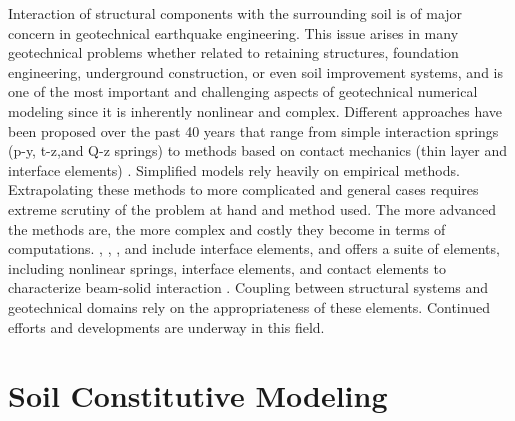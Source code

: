 Interaction of structural components with the surrounding soil is of major concern in geotechnical earthquake engineering. This issue arises in many geotechnical problems whether related to retaining structures, foundation engineering, underground construction, or even soil improvement systems, and is one of the most important and challenging aspects of geotechnical numerical modeling since it is inherently nonlinear and complex. Different approaches have been proposed over the past 40 years that range from simple interaction springs (p-y, t-z,and Q-z springs) \citep{API07} to methods based on contact mechanics (thin layer and interface elements) \citep[see][]{Laursen02}. Simplified models rely heavily on empirical methods. Extrapolating these methods to more complicated and general cases requires extreme scrutiny of the problem at hand and method used. The more advanced the methods are, the more complex and costly they become in terms of computations. , , , and  include interface elements, and  offers a suite of elements, including nonlinear springs, interface elements, and contact elements to characterize beam-solid interaction \citep[see][]{Petek06, Ghofrani18}. Coupling between structural systems and geotechnical domains rely on the appropriateness of these elements. Continued efforts and developments are underway in this field. 

\section{Soil Constitutive Modeling}
\label{sec:resp_geotech_4}

